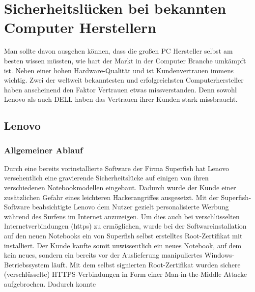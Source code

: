 \section{Sicherheitslücken bei bekannten Computer Herstellern}
Man sollte davon ausgehen können, dass die großen PC Hersteller selbst am besten wissen müssten, wie hart der Markt in der Computer Branche umkämpft ist. Neben einer hohen Hardware-Qualität und ist Kundenvertrauen immens wichtig. Zwei der weltweit bekanntesten und erfolgreichsten Computerhersteller \cite[vgl.]{pc_hersteller} haben anscheinend den Faktor Vertrauen etwas missverstanden. Denn sowohl Lenovo als auch DELL haben das Vertrauen ihrer Kunden stark missbraucht. 

\subsection{Lenovo}
\subsubsection{Allgemeiner Ablauf}
Durch eine bereits vorinstallierte Software der Firma Superfish hat Lenovo versehentlich eine gravierende Sicherheitslücke auf einigen von ihren verschiedenen Notebookmodellen eingebaut. Dadurch wurde der Kunde einer zusätzlichen Gefahr eines leichteren Hackerangriffes ausgesetzt.
Mit der Superfish-Software beabsichtigte Lenovo dem Nutzer gezielt personalisierte Werbung während des Surfens im Internet anzuzeigen. Um dies auch bei verschlüsselten Internetverbindungen (https) zu ermöglichen, wurde bei der Softwareinstallation auf den neuen Notebooks ein von Superfish selbst erstelltes Root-Zertifikat mit installiert. Der Kunde kaufte somit unwissentlich ein neues Notebook, auf dem kein neues, sondern ein bereits vor der Auslieferung manipuliertes Windows-Betriebssystem läuft. 
Mit dem selbst signierten Root-Zertifikat wurden sichere (verschlüsselte) HTTPS-Verbindungen in Form einer Man-in-the-Middle Attacke aufgebrochen. Dadurch konnte

